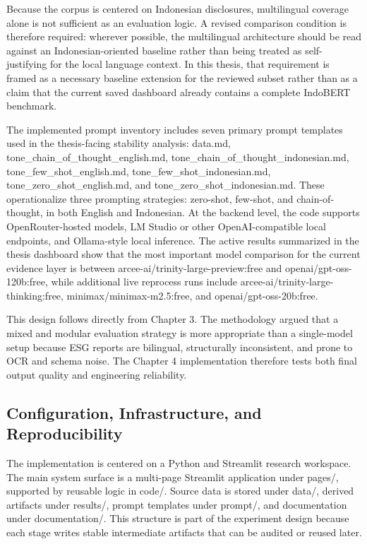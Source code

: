 Because the corpus is centered on Indonesian disclosures, multilingual coverage alone is not sufficient as an evaluation logic. A revised comparison condition is therefore required: wherever possible, the multilingual architecture should be read against an Indonesian-oriented baseline rather than being treated as self-justifying for the local language context. In this thesis, that requirement is framed as a necessary baseline extension for the reviewed subset rather than as a claim that the current saved dashboard already contains a complete IndoBERT benchmark.

The implemented prompt inventory includes seven primary prompt templates used in the thesis-facing stability analysis: data.md, tone\_chain\_of\_thought\_english.md, tone\_chain\_of\_thought\_indonesian.md, tone\_few\_shot\_english.md, tone\_few\_shot\_indonesian.md, tone\_zero\_shot\_english.md, and tone\_zero\_shot\_indonesian.md. These operationalize three prompting strategies: zero-shot, few-shot, and chain-of-thought, in both English and Indonesian. At the backend level, the code supports OpenRouter-hosted models, LM Studio or other OpenAI-compatible local endpoints, and Ollama-style local inference. The active results summarized in the thesis dashboard show that the most important model comparison for the current evidence layer is between arcee-ai/trinity-large-preview:free and openai/gpt-oss-120b:free, while additional live reprocess runs include arcee-ai/trinity-large-thinking:free, minimax/minimax-m2.5:free, and openai/gpt-oss-20b:free.

This design follows directly from Chapter 3. The methodology argued that a mixed and modular evaluation strategy is more appropriate than a single-model setup because ESG reports are bilingual, structurally inconsistent, and prone to OCR and schema noise. The Chapter 4 implementation therefore tests both final output quality and engineering reliability.

\subsection{Configuration, Infrastructure, and Reproducibility}

The implementation is centered on a Python and Streamlit research workspace. The main system surface is a multi-page Streamlit application under pages/, supported by reusable logic in code/. Source data is stored under data/, derived artifacts under results/, prompt templates under prompt/, and documentation under documentation/. This structure is part of the experiment design because each stage writes stable intermediate artifacts that can be audited or reused later.

